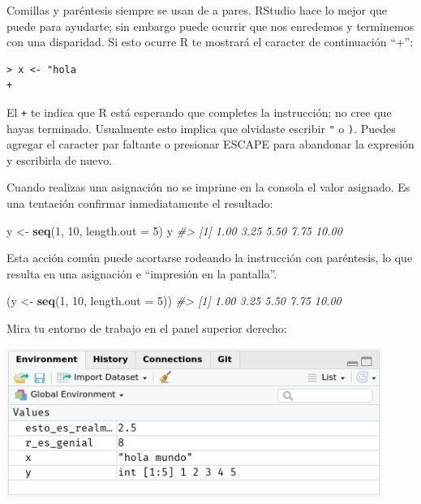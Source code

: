 \documentclass[11pt,oneside]{report}
\newenvironment{Shaded}{\begin{snugshade}}{\end{snugshade}}
\newcommand{\CommentTok}[1]{\textcolor[rgb]{0.56,0.35,0.01}{\textit{#1}}}
\newcommand{\DataTypeTok}[1]{\textcolor[rgb]{0.13,0.29,0.53}{#1}}
\newcommand{\DecValTok}[1]{\textcolor[rgb]{0.00,0.00,0.81}{#1}}
\newcommand{\KeywordTok}[1]{\textcolor[rgb]{0.13,0.29,0.53}{\textbf{#1}}}
\newcommand{\NormalTok}[1]{#1}
\newcommand{\StringTok}[1]{\textcolor[rgb]{0.31,0.60,0.02}{#1}}
\begin{document}
Comillas y paréntesis siempre se usan de a pares. RStudio hace lo mejor
que puede para ayudarte; sin embargo puede ocurrir que nos enredemos y
terminemos con una disparidad. Si esto ocurre R te mostrará el caracter
de continuación ``+'':

\begin{verbatim}
> x <- "hola
+
\end{verbatim}

El \texttt{+} te indica que R está esperando que completes la
instrucción; no cree que hayas terminado. Usualmente esto implica que
olvidaste escribir \texttt{"} o \texttt{)}. Puedes agregar el caracter
par faltante o presionar ESCAPE para abandonar la expresión y escribirla
de nuevo.

Cuando realizas una asignación no se imprime en la consola el valor
asignado. Es una tentación confirmar inmediatamente el resultado:

\begin{Shaded}
\begin{Highlighting}[]
\NormalTok{y <-}\StringTok{ }\KeywordTok{seq}\NormalTok{(}\DecValTok{1}\NormalTok{, }\DecValTok{10}\NormalTok{, }\DataTypeTok{length.out =} \DecValTok{5}\NormalTok{)}
\NormalTok{y}
\CommentTok{#> [1]  1.00  3.25  5.50  7.75 10.00}
\end{Highlighting}
\end{Shaded}

Esta acción común puede acortarse rodeando la instrucción con
paréntesis, lo que resulta en una asignación e ``impresión en la
pantalla''.

\begin{Shaded}
\begin{Highlighting}[]
\NormalTok{(y <-}\StringTok{ }\KeywordTok{seq}\NormalTok{(}\DecValTok{1}\NormalTok{, }\DecValTok{10}\NormalTok{, }\DataTypeTok{length.out =} \DecValTok{5}\NormalTok{))}
\CommentTok{#> [1]  1.00  3.25  5.50  7.75 10.00}
\end{Highlighting}
\end{Shaded}

Mira tu entorno de trabajo en el panel superior derecho:

\begin{center}\includegraphics[width=4.82in]{screenshots/rstudio-env} \end{center}
\end{document}
